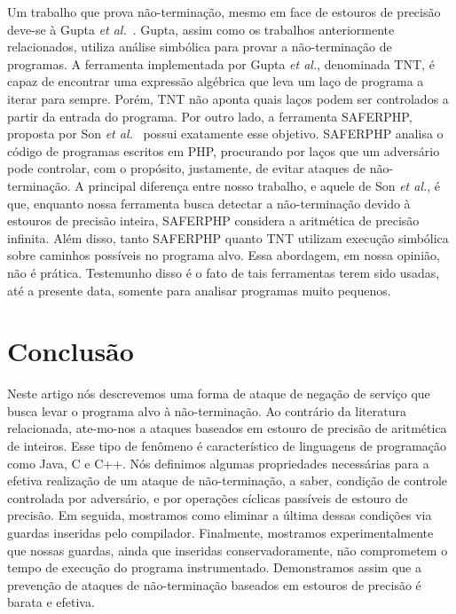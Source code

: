 \documentclass{llncs}
\begin{document}
Um trabalho que prova não-terminação, mesmo em face de estouros de precisão
deve-se à Gupta {\em et al.}~\cite{Gupta08}.
Gupta, assim como os trabalhos anteriormente relacionados, utiliza análise
simbólica para provar a não-terminação de programas.
A ferramenta implementada por Gupta {\em et al.}, denominada TNT, é capaz de
encontrar uma expressão algébrica que leva um laço de programa a iterar
para sempre.
Porém, TNT não aponta quais laços podem ser controlados a partir da entrada
do programa.
Por outro lado, a ferramenta  SAFERPHP, proposta por Son
{\em et al.}~\cite{Son11} possui exatamente esse objetivo.
SAFERPHP analisa o código de programas escritos em PHP, procurando por laços
que um adversário pode controlar, com o propósito, justamente, de evitar
ataques de não-terminação.
A principal diferença entre nosso trabalho, e aquele de Son {\em et al.}, é
que, enquanto nossa ferramenta busca detectar a não-terminação devido à
estouros de precisão inteira, SAFERPHP considera a aritmética de
precisão infinita.
Além disso, tanto SAFERPHP quanto TNT utilizam execução simbólica sobre caminhos
possíveis no programa alvo.
Essa abordagem, em nossa opinião, não é prática.
Testemunho disso é o fato de tais ferramentas terem sido usadas, até a presente
data, somente para analisar programas muito pequenos.

\section{Conclusão}
\label{sec:con}

Neste artigo nós descrevemos uma forma de ataque de negação de serviço que
busca levar o programa alvo à não-terminação.
Ao contrário da literatura relacionada, ate-mo-nos a ataques baseados em
estouro de precisão de aritmética de inteiros.
Esse tipo de fenômeno é característico de linguagens de programação como Java, C e
C++.
Nós definimos algumas propriedades necessárias para a efetiva realização de
um ataque de não-terminação, a saber, condição de controle controlada por
adversário, e por operações cíclicas passíveis de estouro de precisão.
Em seguida, mostramos como eliminar a última dessas condições via guardas
inseridas pelo compilador.
Finalmente, mostramos experimentalmente que nossas guardas, ainda que inseridas
conservadoramente, não comprometem o tempo de execução do programa
instrumentado.
Demonstramos assim que a prevenção de ataques de não-terminação baseados em
estouros de precisão é barata e efetiva.
\end{document}
